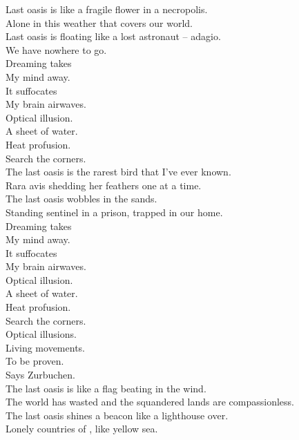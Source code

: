 Last oasis is like a fragile flower in a necropolis. \\
Alone in this weather that covers our world. \\
Last oasis is floating like a lost astronaut -- adagio. \\
We have nowhere to go. \\

Dreaming takes \\
My mind away. \\
It suffocates \\
My brain airwaves. \\

Optical illusion. \\
A sheet of water. \\
Heat profusion. \\
Search the corners. \\

The last oasis is the rarest bird that I've ever known. \\
Rara avis shedding her feathers one at a time. \\
The last oasis wobbles in the  sands. \\
Standing sentinel in a prison, trapped in our home. \\

Dreaming takes \\
My mind away. \\
It suffocates \\
My brain airwaves. \\

Optical illusion. \\
A sheet of water. \\
Heat profusion. \\
Search the corners. \\

Optical illusions. \\
Living movements. \\
To be proven. \\
Says Zurbuchen. \\

The last oasis is like a flag beating in the wind. \\
The world has wasted and the squandered lands are compassionless. \\
The last oasis shines a beacon like a lighthouse over. \\
Lonely countries of , like yellow sea. \\

